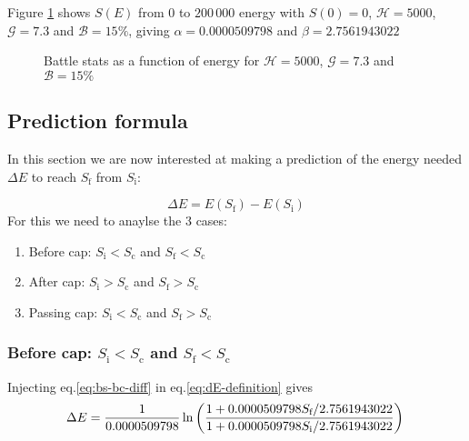 \documentclass[12pt]{article}
\def\happy{\mathcal{H}}
\def\gym{\mathcal{G}}
\def\bonus{\mathcal{B}}
\def\Sc{S_\text{c}}
\def\Si{S_\text{i}}
\def\Sf{S_\text{f}}
\def\Ec{E_\text{c}}
\begin{document}
Figure \ref{fig:example} shows $S(E)$ from $0$ to $200\,000$ energy with $S(0)=0$, $\happy = 5000$, $\gym = 7.3$ and $\bonus= 15\%$, giving $\alpha=0.0000509798$ and $\beta=2.7561943022$

\begin{figure}[!h]
    \centering

    \caption{Battle stats as a function of energy for $\happy = 5000$, $\gym = 7.3$ and $\bonus= 15\%$}
    \label{fig:example}
\end{figure}

\subsection{Prediction formula}
In this section we are now interested at making a prediction of the energy needed $\Delta E$ to reach $\Sf$ from $\Si$:

\begin{equation}
    \Delta E = E(\Sf) - E(\Si)
    \label{eq:dE-definition}
\end{equation}
For this we need to anaylse the 3 cases:
\begin{enumerate}
    \item Before cap: $\Si < \Sc$ and $\Sf < \Sc$
    \item After cap: $\Si > \Sc$ and $\Sf > \Sc$
    \item Passing cap: $\Si < \Sc$ and $\Sf > \Sc$
\end{enumerate}
\subsubsection{Before cap: $\Si < \Sc$ and $\Sf < \Sc$}
Injecting eq.\eqref{eq:bs-bc-diff} in eq.\eqref{eq:dE-definition} gives
\begin{equation}
    \Delta E = \frac{1}{\alpha} \ln\left( \frac{1 + \alpha\Sf/\beta}{1 + \alpha\Si/\beta} \right)\\
\end{equation}
\end{document}
